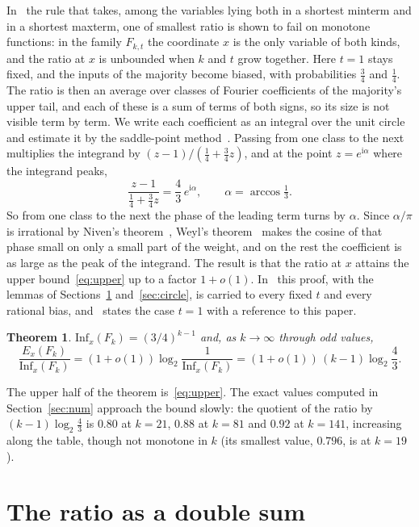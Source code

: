 \documentclass[11pt]{amsart}
\newtheorem{theorem}{Theorem}
\theoremstyle{remark}
\newcommand{\Inf}{\mathrm{Inf}}
\newcommand{\ii}{\mathrm{i}}
\begin{document}
In~\cite[Section~5]{Shm8} the rule that takes, among the variables lying both in a shortest minterm and in a shortest
maxterm, one of smallest ratio is shown to fail on monotone functions: in the family $F_{k,t}$ the coordinate $x$ is
the only variable of both kinds, and the ratio at $x$ is unbounded when $k$ and $t$ grow together. Here $t=1$ stays
fixed, and the inputs of the majority become biased, with probabilities $\frac34$ and $\frac14$. The ratio is then an
average over classes of Fourier coefficients of the majority's upper tail, and each of these is a sum of terms of both
signs, so its size is not visible term by term. We write each coefficient as an integral over the unit circle and
estimate it by the saddle-point method~\cite[Chapter~VIII]{FS09}. Passing from one class to the next multiplies the
integrand by $(z-1)/(\frac14+\frac34z)$, and at the point $z=e^{\ii\alpha}$ where the integrand peaks,
\[
\frac{z-1}{\frac14+\frac34z}=\frac43\,e^{\ii\alpha},\qquad \alpha=\arccos\tfrac13 .
\]
So from one class to the next the phase of the leading term turns by $\alpha$. Since $\alpha/\pi$ is irrational by
Niven's theorem~\cite{Niv}, Weyl's theorem~\cite{Weyl16} makes the cosine of that phase small on only a small part of
the weight, and on the rest the coefficient is as large as the peak of the integrand. The result is that the ratio at
$x$ attains the upper bound~\eqref{eq:upper} up to a factor $1+o(1)$. In~\cite{Shm10} this proof, with the lemmas of
Sections~\ref{sec:sum} and~\ref{sec:circle}, is carried to every fixed $t$ and every rational bias, and~\cite{Shm8}
states the case $t=1$ with a reference to this paper.

\begin{theorem}\label{thm:main}
$\Inf_x(F_k)=(3/4)^{k-1}$ and, as $k\to\infty$ through odd values,
\[
\frac{E_x(F_k)}{\Inf_x(F_k)}=(1+o(1))\log_2\frac1{\Inf_x(F_k)}=(1+o(1))\,(k-1)\log_2\frac43 .
\]
\end{theorem}

The upper half of the theorem is~\eqref{eq:upper}. The exact values computed in Section~\ref{sec:num} approach the
bound slowly: the quotient of the ratio by $(k-1)\log_2\frac43$ is $0.80$ at $k=21$, $0.88$ at $k=81$ and $0.92$ at
$k=141$, increasing along the table, though not monotone in $k$ (its smallest value, $0.796$, is at $k=19$).

\section{The ratio as a double sum}\label{sec:sum}
\end{document}
